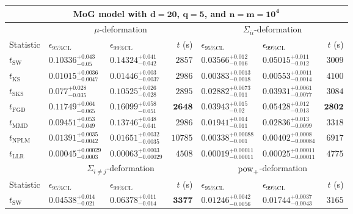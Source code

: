 \begin{tabular}{l|llr|llr}
	\toprule
	\multicolumn{7}{c}{{\bf MoG model with $\mathbf{d=20}$, $\mathbf{q=5}$, and $\mathbf{n=m=10^{4}}$}} \\
	\toprule
	\multicolumn{1}{c}{} & \multicolumn{3}{c}{$\mu$-deformation} & \multicolumn{3}{c}{$\Sigma_{ii}$-deformation} \\
	Statistic & $\epsilon_{95\%\mathrm{CL}}$ & $\epsilon_{99\%\mathrm{CL}}$ & $t$ (s) & $\epsilon_{95\%\mathrm{CL}}$ & $\epsilon_{99\%\mathrm{CL}}$ & $t$ (s) \\
	\midrule
	$t_{\mathrm{SW}}$ & $0.10336_{-0.05}^{+0.043}$ & $0.14324_{-0.042}^{+0.041}$ & $2857$ & $0.03566_{-0.016}^{+0.012}$ & $0.05015_{-0.012}^{+0.011}$ & $3009$ \\
	$t_{\overline{\mathrm{KS}}}$ & ${\mathbf{0.01015_{-0.0047}^{+0.0036}}}$ & ${\mathbf{0.01446_{-0.0037}^{+0.003}}}$ & $2986$ & ${\mathbf{0.00383_{-0.0018}^{+0.0013}}}$ & ${\mathbf{0.00553_{-0.0014}^{+0.0011}}}$ & $4100$ \\
	$t_{\mathrm{SKS}}$ & $0.077_{-0.035}^{+0.028}$ & $0.10525_{-0.028}^{+0.026}$ & $2895$ & $0.02882_{-0.011}^{+0.0073}$ & $0.03931_{-0.0077}^{+0.0061}$ & $3084$ \\
	$t_{\mathrm{FGD}}$ & $0.11749_{-0.065}^{+0.064}$ & $0.16099_{-0.051}^{+0.058}$ & ${\mathbf{2648}}$ & $0.03943_{-0.02}^{+0.015}$ & $0.05428_{-0.013}^{+0.012}$ & ${\mathbf{2802}}$ \\
	$t_{\mathrm{MMD}}$ & $0.09451_{-0.049}^{+0.053}$ & $0.13746_{-0.041}^{+0.048}$ & $2986$ & $0.01941_{-0.011}^{+0.014}$ & $0.02836_{-0.0099}^{+0.013}$ & $3318$ \\
\rowcolor{red!35}	$t_{\mathrm{NPLM}}$ & $0.01391_{-0.0042}^{+0.0035}$ & $0.01651_{-0.0035}^{+0.0032}$ & $10785$ & $0.00338_{-0.001}^{+0.00088}$ & $0.00402_{-0.00084}^{+0.0008}$ & $6917$ \\
	$t_{\mathrm{LLR}}$ & $0.00045_{-0.0003}^{+0.00029}$ & $0.00063_{-0.00029}^{+0.0003}$ & $4508$ & $0.00019_{-0.00011}^{+0.00011}$ & $0.00025_{-0.00011}^{+0.00011}$ & $4775$ \\
	\toprule
	\multicolumn{1}{c}{} & \multicolumn{3}{c}{$\Sigma_{i\neq j}$-deformation} & \multicolumn{3}{c}{$\rm{pow}_{+}$-deformation} \\
	Statistic & $\epsilon_{95\%\mathrm{CL}}$ & $\epsilon_{99\%\mathrm{CL}}$ & $t$ (s) & $\epsilon_{95\%\mathrm{CL}}$ & $\epsilon_{99\%\mathrm{CL}}$ & $t$ (s) \\
	\midrule
	$t_{\mathrm{SW}}$ & $0.04538_{-0.021}^{+0.014}$ & $0.06378_{-0.014}^{+0.011}$ & ${\mathbf{3377}}$ & $0.01246_{-0.0056}^{+0.0042}$ & $0.01744_{-0.0043}^{+0.0037}$ & $3165$ \\

\end{tabular}
